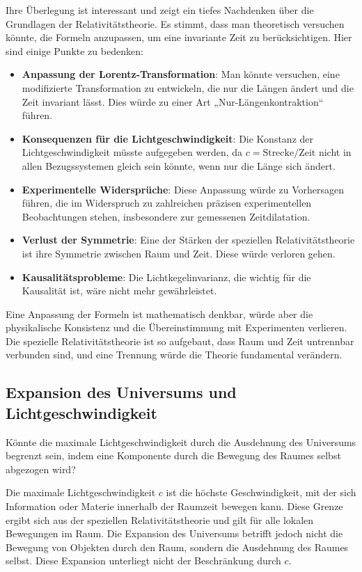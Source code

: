 \documentclass[a4paper,12pt]{article}
\begin{document}
	Ihre Überlegung ist interessant und zeigt ein tiefes Nachdenken über die Grundlagen der Relativitätstheorie. Es stimmt, dass man theoretisch versuchen könnte, die Formeln anzupassen, um eine invariante Zeit zu berücksichtigen. Hier sind einige Punkte zu bedenken:
	\begin{itemize}
		\item \textbf{Anpassung der Lorentz-Transformation}: Man könnte versuchen, eine modifizierte Transformation zu entwickeln, die nur die Längen ändert und die Zeit invariant lässt. Dies würde zu einer Art „Nur-Längenkontraktion“ führen.
		\item \textbf{Konsequenzen für die Lichtgeschwindigkeit}: Die Konstanz der Lichtgeschwindigkeit müsste aufgegeben werden, da \( c = \text{Strecke/Zeit} \) nicht in allen Bezugssystemen gleich sein könnte, wenn nur die Länge sich ändert.
		\item \textbf{Experimentelle Widersprüche}: Diese Anpassung würde zu Vorhersagen führen, die im Widerspruch zu zahlreichen präzisen experimentellen Beobachtungen stehen, insbesondere zur gemessenen Zeitdilatation.
		\item \textbf{Verlust der Symmetrie}: Eine der Stärken der speziellen Relativitätstheorie ist ihre Symmetrie zwischen Raum und Zeit. Diese würde verloren gehen.
		\item \textbf{Kausalitätsprobleme}: Die Lichtkegelinvarianz, die wichtig für die Kausalität ist, wäre nicht mehr gewährleistet.
	\end{itemize}
	
	Eine Anpassung der Formeln ist mathematisch denkbar, würde aber die physikalische Konsistenz und die Übereinstimmung mit Experimenten verlieren. Die spezielle Relativitätstheorie ist so aufgebaut, dass Raum und Zeit untrennbar verbunden sind, und eine Trennung würde die Theorie fundamental verändern.
	
	\subsection{Expansion des Universums und Lichtgeschwindigkeit}
	Könnte die maximale Lichtgeschwindigkeit durch die Ausdehnung des Universums begrenzt sein, indem eine Komponente durch die Bewegung des Raumes selbst abgezogen wird?
	
	Die maximale Lichtgeschwindigkeit \( c \) ist die höchste Geschwindigkeit, mit der sich Information oder Materie innerhalb der Raumzeit bewegen kann. Diese Grenze ergibt sich aus der speziellen Relativitätstheorie und gilt für alle lokalen Bewegungen im Raum. Die Expansion des Universums betrifft jedoch nicht die Bewegung von Objekten durch den Raum, sondern die Ausdehnung des Raumes selbst. Diese Expansion unterliegt nicht der Beschränkung durch \( c \).
	
\end{document}
